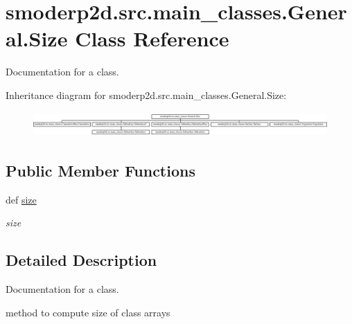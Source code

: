 \hypertarget{classsmoderp2d_1_1src_1_1main__classes_1_1General_1_1Size}{\section{smoderp2d.\-src.\-main\-\_\-classes.\-General.\-Size Class Reference}
\label{classsmoderp2d_1_1src_1_1main__classes_1_1General_1_1Size}
}


Documentation for a class.  


Inheritance diagram for smoderp2d.\-src.\-main\-\_\-classes.\-General.\-Size\-:\begin{figure}[H]
\begin{center}
\leavevmode
\includegraphics[height=0.965517cm]{classsmoderp2d_1_1src_1_1main__classes_1_1General_1_1Size}
\end{center}
\end{figure}
\subsection*{Public Member Functions}
\begin{DoxyCompactItemize}
\item 
def \hyperlink{classsmoderp2d_1_1src_1_1main__classes_1_1General_1_1Size_a8546bcd644a0f79337648b9b1badaf4a}{size}
\begin{DoxyCompactList}\small\item\em size \end{DoxyCompactList}\end{DoxyCompactItemize}


\subsection{Detailed Description}
Documentation for a class. 

method to compute size of class arrays 

